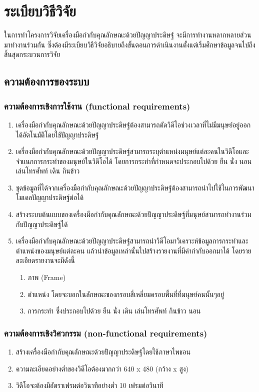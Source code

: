 \chapter{ระเบียบวิธีวิจัย}
ในการทําโครงการวิจัยเครื่องมือกำกับคุณลักษณะด้วยปัญญาประดิษฐ์ จะมีการทำงานหลากหลายส่วนมาทำงานร่วมกัน 
ซึ่งต้องมีระเบียบวิธีวิจัยอธิบายถึงขั้นตอนการดำเนินงานตั้งแต่เริ่มศึกษาข้อมูลจนไปถึงสิ้นสุดกระบวนการวิจัย
\section{ความต้องการของระบบ}
\subsection{ความต้องการเชิงการใช้งาน (functional requirements)}
\begin{enumerate}
	\setlength\itemsep{-0.25em}
    \item เครื่องมือกำกับคุณลักษณะด้วยปัญญาประดิษฐ์ต้องสามารถตัดวิดีโอช่วงเวลาที่ไม่มีมนุษย์อยู่ออกได้อัตโนมัติโดยใช้ปัญญาประดิษฐ์ 
	\item เครื่องมือกำกับคุณลักษณะด้วยปัญญาประดิษฐ์สามารถระบุตำแหน่งมนุษย์แต่ละคนในวิดีโอและจำแนกการกระทำของมนุษย์ในวิดีโอได้ 
	โดยการกระทำที่กำหนดจะประกอบไปด้วย ยืน นั่ง นอน เล่นโทรศัพท์ เดิน กินข้าว
	\item ชุดข้อมูลที่ได้จากเครื่องมือกำกับคุณลักษณะด้วยปัญญาประดิษฐ์ต้องสามารถนำไปใช้ในการพัฒนาโมเดลปัญญาประดิษฐ์ต่อได้ 
	\item สร้างระบบต้นแบบของเครื่องมือกำกับคุณลักษณะด้วยปัญญาประดิษฐ์ที่มนุษย์สามารถทำงานร่วมกับปัญญาประดิษฐ์ได้
	\item เครื่องมือกำกับคุณลักษณะด้วยปัญญาประดิษฐ์สามารถนำวิดีโอมาวิเคราะห์ข้อมูลการกระทำและตำแหน่งของมนุษย์แต่ละคน แล้วนำข้อมูลเหล่านั้นไปสร้างรายงานที่มีคำกำกับออกมาได้ โดยรายละเอียดรายงานจะมีดังนี้
	\begin{enumerate}
		\item ภาพ (Frame)
		\item ตำแหน่ง โดยจะบอกในลักษณะของกรอบสี่เหลี่ยมครอบพื้นที่ที่มนุษย์คนนั้นๆอยู่
		\item การกระทำ ซึ่งประกอบไปด้วย ยืน นั่ง เดิน เล่นโทรศัพท์ กินข้าว นอน
	\end{enumerate}
\end{enumerate}
\subsection{ความต้องการเชิงวิศวกรรม (non-functional requirements)}
\begin{enumerate}
	\setlength\itemsep{-0.25em}
	\item สร้างเครื่องมือกำกับคุณลักษณะด้วยปัญญาประดิษฐ์โดยใช้ภาษาไพธอน
	\item ความละเอียดอย่างต่ำของวิดีโอต้องมากกว่า 640 x 480 (กว้าง x สูง) 
	\item วิดีโอจะต้องมีอัตราเฟรมต่อวินาทีอย่างต่ำ 10 เฟรมต่อวินาที
\end{enumerate}
\clearpage

